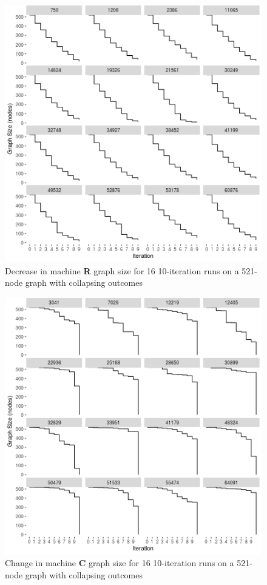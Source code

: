 \documentclass{tufte-handout}
\begin{document}
\begin{figure}[htb]
\includegraphics{rcol_stepdown.png}
\caption{Decrease in machine \textbf{R} graph size for 16 10-iteration runs
on a 521-node graph with collapsing outcomes}
\label{fig:RCollapseDynamics}
\end{figure}

\begin{figure}[htb]
\includegraphics{ccol_stepdown.png}
\caption{Change in machine \textbf{C} graph size for 16 10-iteration runs
on a 521-node graph with collapsing outcomes}
\label{fig:CCollapseDynamics}
\end{figure}
\end{document}
